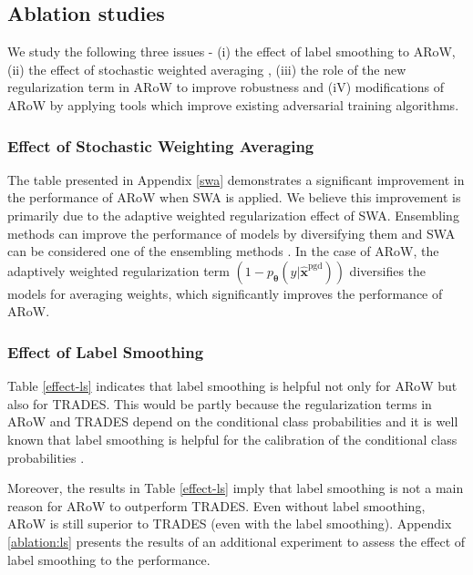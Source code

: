 \documentclass[nohyperref]{article}
\theoremstyle{plain}
\theoremstyle{definition}
\theoremstyle{remark}
\begin{document}
\subsection{Ablation studies}
\label{ablation}
We study the following three issues - (i) the effect of label smoothing to ARoW, 
(ii) the effect of stochastic weighted averaging \cite{izmailov2018averaging},
(iii) the role of the new regularization term in ARoW to improve robustness
and (iV) modifications of ARoW by applying tools
which improve existing adversarial training algorithms.

\subsubsection{Effect of Stochastic Weighting Averaging}
The table presented in Appendix \ref{swa} demonstrates a significant improvement in the performance of ARoW when SWA is applied.
We believe this improvement is primarily due to the adaptive weighted regularization effect of SWA. 
Ensembling methods can improve the performance of models by diversifying them \citep{jantre2022sequential} and SWA can be considered one of the ensembling methods \citep{izmailov2018averaging}. In the case of ARoW, the adaptively weighted regularization term $(1-p_{\bm{\theta}}(y|\widehat{\bm{x}}^{\text{pgd}}))$ diversifies the models for averaging weights, which significantly improves the performance of ARoW.

\subsubsection{Effect of Label Smoothing}

Table \ref{effect-ls} indicates that 
 label smoothing is helpful not only for ARoW but also for TRADES. This would be partly because the regularization terms in ARoW and TRADES
depend on the conditional class probabilities and it is well known that label smoothing is helpful for the calibration of the conditional class probabilities \citep{pereyra2017regularzing}. 

Moreover, the results in Table \ref{effect-ls} imply that label smoothing is not a main reason for
ARoW to outperform TRADES. Even without label smoothing, ARoW is still superior to TRADES (even with the
label smoothing). 
Appendix \ref{ablation:ls} presents the results of an additional experiment to assess
the effect of label smoothing to the performance.
\end{document}
